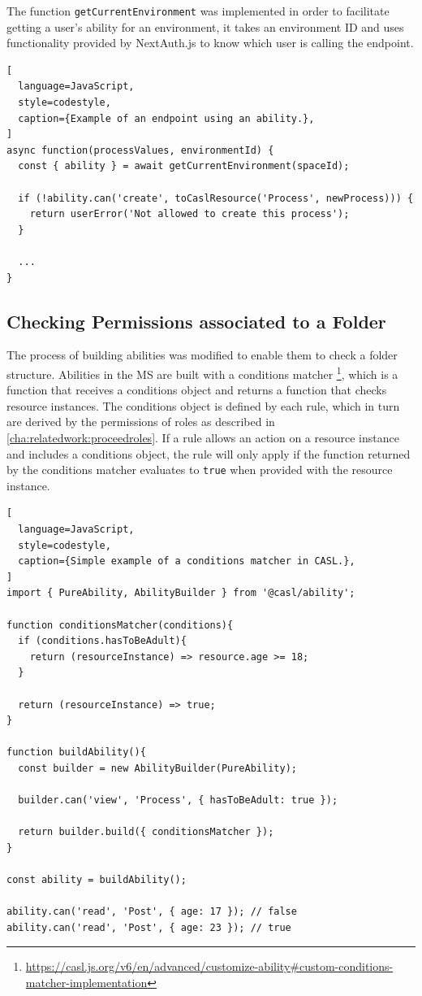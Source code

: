 The function \lstinline{getCurrentEnvironment} was implemented in order to facilitate
getting a user's ability for an environment, it takes an environment ID and uses
functionality provided by NextAuth.js to know which user is calling the endpoint.

\begin{lstlisting}[
  language=JavaScript,
  style=codestyle,
  caption={Example of an endpoint using an ability.},
]
async function(processValues, environmentId) {
  const { ability } = await getCurrentEnvironment(spaceId);

  if (!ability.can('create', toCaslResource('Process', newProcess))) {
    return userError('Not allowed to create this process');
  }

  ...
}
\end{lstlisting}

\subsection{Checking Permissions associated to a Folder}

The process of building abilities was modified to enable them to check a folder structure.
Abilities in the MS are built with a conditions matcher
\footnote{\url{https://casl.js.org/v6/en/advanced/customize-ability\#custom-conditions-matcher-implementation}},
which is a function that receives a conditions object and returns a function that checks
resource instances.
The conditions object is defined by each rule, which in turn are derived by the
permissions of roles as described in \ref{cha:relatedwork:proceedroles}.
If a rule allows an action on a resource instance and includes a conditions object, the
rule will only apply if the function returned by the conditions matcher evaluates to
\lstinline{true} when provided with the resource instance.

\begin{lstlisting}[
  language=JavaScript,
  style=codestyle,
  caption={Simple example of a conditions matcher in CASL.},
]
import { PureAbility, AbilityBuilder } from '@casl/ability';

function conditionsMatcher(conditions){
  if (conditions.hasToBeAdult){
    return (resourceInstance) => resource.age >= 18;
  }

  return (resourceInstance) => true;
}

function buildAbility(){
  const builder = new AbilityBuilder(PureAbility);

  builder.can('view', 'Process', { hasToBeAdult: true });

  return builder.build({ conditionsMatcher });
}

const ability = buildAbility();

ability.can('read', 'Post', { age: 17 }); // false
ability.can('read', 'Post', { age: 23 }); // true
\end{lstlisting}

